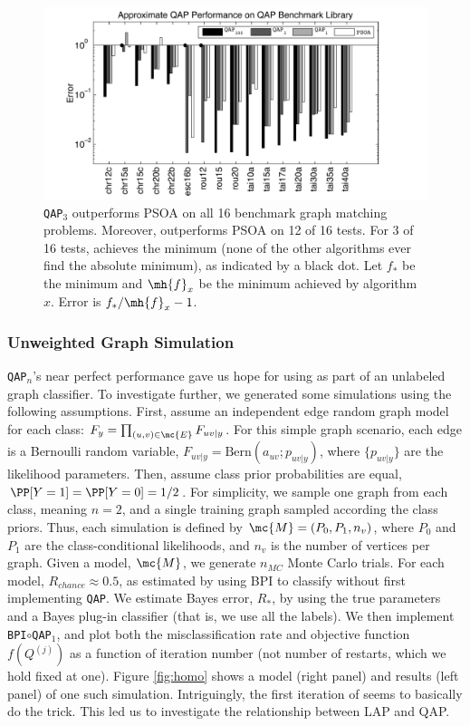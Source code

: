 \documentclass[10pt,journal,cspaper,compsoc]{IEEEtran}
\begin{document}
\begin{figure}[htbp]
	\centering			
	\includegraphics[width=1.0\linewidth]{../figs/benchmarks.pdf}
	\caption{\texttt{QAP}$_3$ outperforms PSOA on all 16 benchmark graph matching problems.  Moreover, \qapa outperforms PSOA on 12 of 16 tests.  For 3 of 16 tests, \qapb achieves the minimum (none of the other algorithms ever find the absolute minimum), as indicated by a black dot.  Let $f_*$ be the minimum and $\mh{f}_x$ be the minimum achieved by algorithm $x$.  Error is $f_*/\mh{f}_x-1$.  }
	\label{fig:fwpath}
\end{figure}




\subsubsection{Unweighted Graph Simulation}

\texttt{QAP}$_n$'s near perfect performance gave us hope for using \qap as part of an unlabeled graph classifier.  To investigate further, we generated some simulations using the following assumptions.  First, assume an independent edge random graph model for each class: $F_y=\prod_{(u,v) \in \mc{E}} F_{uv|y}$.  For this simple graph scenario, each edge is a Bernoulli random variable, $F_{uv|y}=\text{Bern}(a_{uv}; p_{uv|y})$, where $\{p_{uv|y}\}$ are the likelihood parameters.  Then, assume class prior probabilities are equal, $\PP[Y=1]=\PP[Y=0]=1/2$.  For simplicity, we sample one graph from each class, meaning $n=2$, and a single training graph sampled according the class priors. Thus, each simulation is defined by $\mc{M}=(P_0,P_1,n_v)$, where $P_0$ and $P_1$ are the class-conditional likelihoods, and $n_v$ is the number of vertices per graph.  Given a model, $\mc{M}$, we generate $n_{MC}$ Monte Carlo trials.  For each model, $R_{chance}\approx 0.5$, as estimated by using BPI to classify without first implementing \texttt{QAP}.  We estimate Bayes error, $R_*$, by using the true parameters and a Bayes plug-in classifier (that is, we use all the labels).  We then implement \texttt{BPI}$\circ$\texttt{QAP}$_1$, and plot both the misclassification rate and objective function $f(Q^{(j)})$ as a function of iteration number (not number of restarts, which we hold fixed at one). Figure \ref{fig:homo} shows a model (right panel) and results (left panel) of one such simulation. Intriguingly, the first iteration of \qapa seems to basically do the trick.  This led us to investigate the relationship between LAP and QAP.
\end{document}
